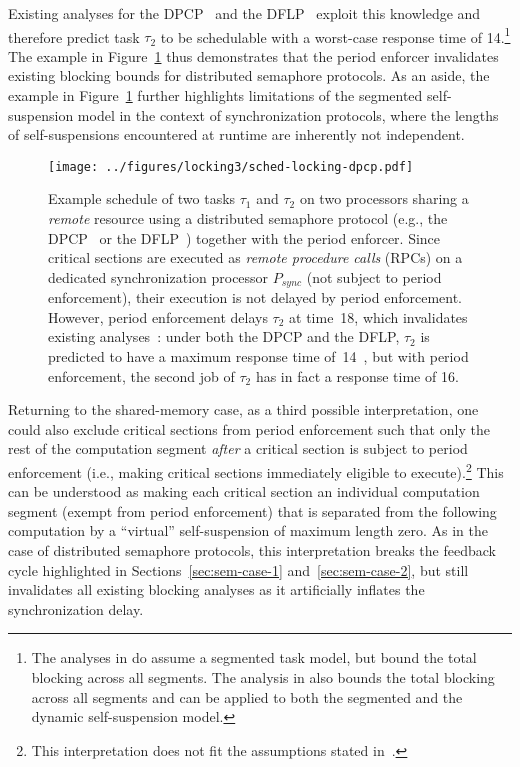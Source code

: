  Existing analyses for the DPCP~\cite{RSL:88,Raj:91,Br:13} and the DFLP~\cite{Br:13} exploit this knowledge and therefore predict task $\tau_2$ to be schedulable with a worst-case response time of 14.\footnote{The analyses in \cite{RSL:88,Raj:91} do assume a segmented task model, but bound the total blocking across all segments. The analysis in \cite{Br:13} also bounds the total blocking across all segments and can be applied to both the segmented and the dynamic self-suspension model.} The example in Figure~\ref{fig:locking-dpcp} thus demonstrates that the period enforcer invalidates existing blocking bounds for distributed semaphore protocols. As an aside, the example in Figure~\ref{fig:locking-dpcp} further highlights limitations of the segmented self-suspension model in the context of synchronization protocols, where the lengths of self-suspensions encountered at runtime are inherently not independent.


\begin{figure}[t]
  \centering
  \texttt{[image: ../figures/locking3/sched-locking-dpcp.pdf]}
  \caption{Example schedule of two tasks $\tau_1$ and $\tau_2$ on two processors sharing a \emph{remote} resource using a distributed semaphore protocol (e.g., the DPCP~\cite{RSL:88,Raj:91} or the DFLP~\cite{Br:13,Br:14}) together with the period enforcer. Since critical sections are executed as \emph{remote procedure calls} (RPCs) on a dedicated synchronization processor $P_{sync}$ (not subject to period enforcement), their execution is not delayed by period enforcement. However, period enforcement delays $\tau_2$ at time~18, which invalidates existing analyses~\cite{RSL:88,Raj:91,Br:13}: under both the DPCP and the DFLP, $\tau_2$ is predicted to have a maximum response time of~14~\cite{Br:13}, but with period enforcement, the second job of $\tau_2$ has in fact a response time of 16.
  }
  \label{fig:locking-dpcp}
\end{figure}

Returning to the shared-memory case,
as a third possible interpretation, one could also exclude critical sections from period enforcement such that only the rest of the computation segment \emph{after} a critical section is subject to period enforcement (i.e., making critical sections immediately eligible to execute).\footnote{This interpretation does not fit the assumptions stated in~\cite{Raj:suspension1991,Raj:91}.} This can be understood as making each critical section an individual computation segment (exempt from period enforcement) that is separated from the following computation by a ``virtual'' self-suspension of maximum length zero. As in the case of distributed semaphore protocols, this interpretation breaks the feedback cycle highlighted in Sections~\ref{sec:sem-case-1} and~\ref{sec:sem-case-2}, but still invalidates all existing blocking analyses as it artificially inflates the synchronization delay.

